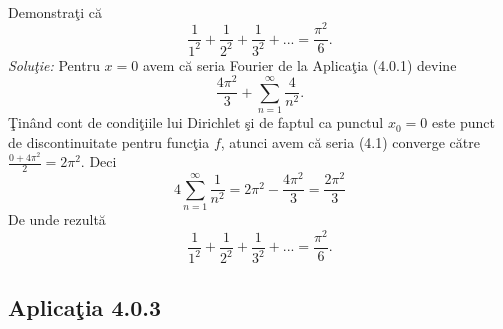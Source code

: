 \documentclass[a4paper,openany,12pt]{report}
\begin{document}
\paragraph*{} Demonstra\c ti c\u a 
\begin{equation*}
\frac{1}{1^2}+\frac{1}{2^2}+\frac{1}{3^2}+...=\frac{\pi^2}{6}.
\end{equation*}
\newline
\textit{Solu\c tie:}
\newline
Pentru $x=0$ avem c\u a seria Fourier de la Aplica\c tia (4.0.1) devine
\begin{equation}
\frac{4\pi^2}{3} +  \sum_{n=1}^\infty \frac{4}{n^2}.
\end{equation}
\c Tin\^ and cont de condi\c tiile lui Dirichlet \c si de faptul ca punctul $x_0=0$ este punct de discontinuitate pentru func\c tia $f$, atunci avem c\u a seria (4.1) converge c\u atre $\frac{0+4\pi^2}{2}=2\pi^2$. Deci
\begin{equation*}
4\sum_{n=1}^\infty \frac{1}{n^2}=2\pi^2-\frac{4\pi^2}{3}=\frac{2\pi^2}{3}
\end{equation*}
De unde rezult\u a
\begin{equation*}
\frac{1}{1^2}+\frac{1}{2^2}+\frac{1}{3^2}+...=\frac{\pi^2}{6}.
\end{equation*}





\subsection*{Aplica\c tia 4.0.3}
\end{document}
